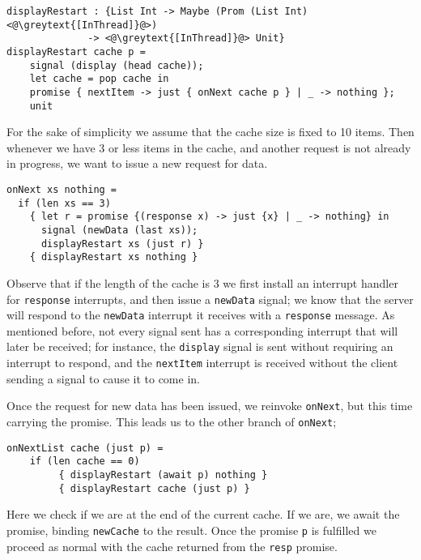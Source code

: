 \documentclass[msc,deptreport,cs]{infthesis} %
\newcommand{\code}[1]{\lstinline{#1}}
\newcommand{\greytext}[1]{\textcolor{black!40}{#1}}
\begin{document}
\begin{lstlisting}
displayRestart : {List Int -> Maybe (Prom (List Int) <@\greytext{[InThread]}@>)
              -> <@\greytext{[InThread]}@> Unit}
displayRestart cache p =
    signal (display (head cache));
    let cache = pop cache in
    promise { nextItem -> just { onNext cache p } | _ -> nothing };
    unit
\end{lstlisting}


For the sake of simplicity we assume that the cache size is fixed to 10 items.
Then whenever we have 3 or less items in the cache, and another request is not
already in progress, we want to issue a new request for data.

\begin{lstlisting}
onNext xs nothing =
  if (len xs == 3)
    { let r = promise {(response x) -> just {x} | _ -> nothing} in
      signal (newData (last xs));
      displayRestart xs (just r) }
    { displayRestart xs nothing }
\end{lstlisting}

\noindent Observe that if the length of the cache is 3 we first install an
interrupt handler for \code{response} interrupts, and then issue a
\code{newData} signal; we know that the server will respond to the
\code{newData} interrupt it receives with a \code{response} message. As
mentioned before, not every signal sent has a corresponding interrupt that will
later be received; for instance, the \code{display} signal is sent without
requiring an interrupt to respond, and the \code{nextItem} interrupt is received
without the client sending a signal to cause it to come in.

Once the request for new data has been issued, we reinvoke \code{onNext}, but
this time carrying the promise. This leads us to the other branch of
\code{onNext};

\begin{lstlisting}
onNextList cache (just p) =
    if (len cache == 0)
         { displayRestart (await p) nothing }
         { displayRestart cache (just p) }
\end{lstlisting}

\noindent Here we check if we are at the end of the current cache. If we are, we
await the promise, binding \code{newCache} to the result. Once the promise
\code{p} is fulfilled we proceed as normal with the cache returned from the
\code{resp} promise.
\end{document}
